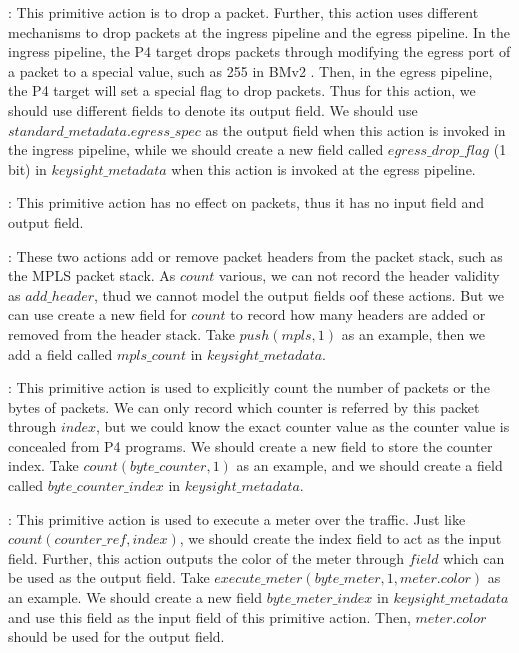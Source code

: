 \documentclass[sigconf, 10pt]{acmart}
\theoremstyle{plain}
\begin{document}
: This primitive action is to drop a packet. Further, this action uses different mechanisms to drop packets at the ingress pipeline and the egress pipeline. In the ingress pipeline, the P4 target drops packets through modifying the egress port of a packet to a special value, such as 255 in BMv2 \cite{bmv2-P4}. Then, in the egress pipeline, the P4 target will set a special flag to drop packets. Thus for this action, we should use different fields to denote its output field. We should use $standard\_metadata.egress\_spec$ as the output field when this action is invoked in the ingress pipeline, while we should create a new field called $egress\_drop\_flag$ (1 bit) in $keysight\_metadata$  when this action is invoked at the egress pipeline.

: This primitive action has no effect on packets, thus it has no input field and output field.

: These two actions add or remove packet headers from the packet stack, such as the MPLS packet stack. As $count$ various, we can not record the header validity as $add\_header$, thud we cannot model the output fields oof these actions. But we can use create a new field for $count$ to record how many headers are added or removed from the header stack. Take $push(mpls, 1)$ as an example, then we add a field called $mpls\_count$ in $keysight\_metadata$.

: This primitive action is used to explicitly count the number of packets or the bytes of packets. We can only record which counter is referred by this packet through $index$, but we could know the exact counter value as the counter value is concealed from P4 programs. We should create a new field to store the counter index. Take $count(byte\_counter, 1)$ as an example, and we should create a field called $byte\_counter\_index$ in $keysight\_metadata$.

: This primitive action is used to execute a meter over the traffic. Just like $count (counter\_ref, index)$, we should create the index field to act as the input field. Further, this action outputs the color of the meter through $field$ which can be used as the output field. Take $execute\_meter (byte\_meter, 1, meter.color)$ as an example. We should create a new field $byte\_meter\_index$ in $keysight\_metadata$ and use this field as the input field of this primitive action. Then, $meter.color$ should be used for the output field.
\end{document}

